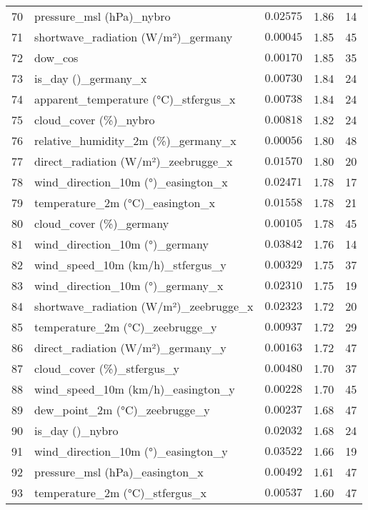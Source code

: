 \begin{table}[H]
\begin{tabular}{r l l l l}
        70 & pressure\_msl (hPa)\_nybro & $0.02575$ & 1.86 & 14 \\
        71 & shortwave\_radiation (W/m²)\_germany & $0.00045$ & 1.85 & 45 \\
        72 & dow\_cos & $0.00170$ & 1.85 & 35 \\
        73 & is\_day ()\_germany\_x & $0.00730$ & 1.84 & 24 \\
        74 & apparent\_temperature (°C)\_stfergus\_x & $0.00738$ & 1.84 & 24 \\
        75 & cloud\_cover (\%)\_nybro & $0.00818$ & 1.82 & 24 \\
        76 & relative\_humidity\_2m (\%)\_germany\_x & $0.00056$ & 1.80 & 48 \\
        77 & direct\_radiation (W/m²)\_zeebrugge\_x & $0.01570$ & 1.80 & 20 \\
        78 & wind\_direction\_10m (°)\_easington\_x & $0.02471$ & 1.78 & 17 \\
        79 & temperature\_2m (°C)\_easington\_x & $0.01558$ & 1.78 & 21 \\
        80 & cloud\_cover (\%)\_germany & $0.00105$ & 1.78 & 45 \\
        81 & wind\_direction\_10m (°)\_germany & $0.03842$ & 1.76 & 14 \\
        82 & wind\_speed\_10m (km/h)\_stfergus\_y & $0.00329$ & 1.75 & 37 \\
        83 & wind\_direction\_10m (°)\_germany\_x & $0.02310$ & 1.75 & 19 \\
        84 & shortwave\_radiation (W/m²)\_zeebrugge\_x & $0.02323$ & 1.72 & 20 \\
        85 & temperature\_2m (°C)\_zeebrugge\_y & $0.00937$ & 1.72 & 29 \\
        86 & direct\_radiation (W/m²)\_germany\_y & $0.00163$ & 1.72 & 47 \\
        87 & cloud\_cover (\%)\_stfergus\_y & $0.00480$ & 1.70 & 37 \\
        88 & wind\_speed\_10m (km/h)\_easington\_y & $0.00228$ & 1.70 & 45 \\
        89 & dew\_point\_2m (°C)\_zeebrugge\_y & $0.00237$ & 1.68 & 47 \\
        90 & is\_day ()\_nybro & $0.02032$ & 1.68 & 24 \\
        91 & wind\_direction\_10m (°)\_easington\_y & $0.03522$ & 1.66 & 19 \\
        92 & pressure\_msl (hPa)\_easington\_x & $0.00492$ & 1.61 & 47 \\
        93 & temperature\_2m (°C)\_stfergus\_x & $0.00537$ & 1.60 & 47 \\

\end{tabular}
\end{table}
